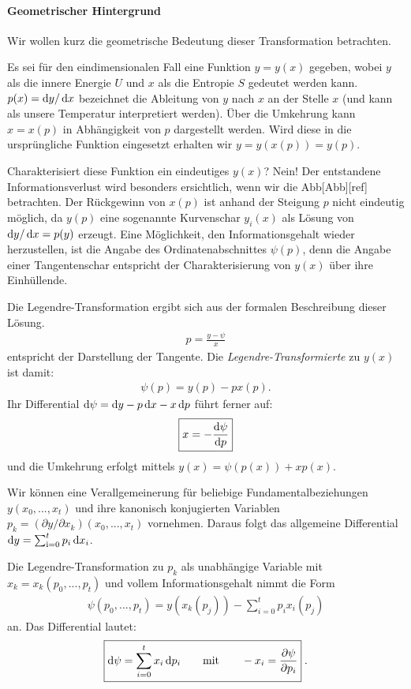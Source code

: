 \paragraph*{Geometrischer Hintergrund}
Wir wollen kurz die geometrische Bedeutung dieser Transformation betrachten. 

Es sei für den  eindimensionalen Fall eine Funktion $y=y(x)$ gegeben, wobei $y$ als die innere Energie $U$ und $x$ als die Entropie $S$ gedeutet werden kann. $p(x)=\mathop{}\!\mathrm{d} y/ \mathop{}\!\mathrm{d} x$ bezeichnet die Ableitung von $y$ nach $x$ an der Stelle $x$ (und kann als unsere Temperatur interpretiert werden). Über die Umkehrung kann $x=x(p)$ in Abhängigkeit von $p$ dargestellt werden. Wird diese in die ursprüngliche Funktion eingesetzt erhalten wir $y=y(x(p))=y(p)$. 

Charakterisiert diese Funktion ein eindeutiges $y(x)$? Nein! Der entstandene Informationsverlust wird besonders ersichtlich, wenn wir die Abb[Abb][ref] betrachten. Der Rückgewinn von $x(p)$ ist anhand der Steigung $p$ nicht eindeutig möglich, da $y(p)$ eine sogenannte Kurvenschar $y_i(x)$ als Lösung von $\mathop{}\!\mathrm{d} y/\mathop{}\!\mathrm{d} x=p(y)$ erzeugt. Eine Möglichkeit, den Informationsgehalt wieder herzustellen, ist die Angabe des Ordinatenabschnittes $\psi(p)$, denn die Angabe einer Tangentenschar entspricht der Charakterisierung von $y(x)$ über ihre Einhüllende. 

Die Legendre-Transformation ergibt sich aus der formalen Beschreibung dieser Lösung.
\begin{align*}
    p=\frac{y-\psi}{x}
\end{align*}
entspricht der Darstellung der Tangente.
Die \emph{Legendre-Transformierte} zu $y(x)$ ist damit:
\begin{align*}
    \boxed{\psi(p)=y(p)-px(p)}.
\end{align*}
Ihr Differential $\mathop{}\!\mathrm{d} \psi=\mathop{}\!\mathrm{d} y-p\mathop{}\!\mathrm{d} x-x\mathop{}\!\mathrm{d} p$ führt ferner auf:
\begin{align*}
    \boxed{x=-\frac{\mathop{}\!\mathrm{d} \psi}{\mathop{}\!\mathrm{d} p}}
\end{align*}
und die Umkehrung erfolgt mittels $y(x)=\psi(p(x))+xp(x)$.

Wir können eine Verallgemeinerung für beliebige Fundamentalbeziehungen $y(x_0,...,x_t)$ und ihre kanonisch konjugierten Variablen $p_k=(\partial y/\partial x_k)(x_0,...,x_t)$ vornehmen.
Daraus folgt das allgemeine Differential $\mathop{}\!\mathrm{d} y=\sum_\mathrm{i=0}^tp_i\mathop{}\!\mathrm{d} x_i$. 
\begin{formal}
    Die Legendre-Transformation zu $p_k$ als unabhängige Variable mit $x_k=x_k(p_0,...,p_t)$ und vollem Informationsgehalt nimmt die Form 
\begin{align*}
    \boxed{\psi(p_0,...,p_t)=y(x_k(p_j))-\sum^t_{i=0}p_ix_i(p_j)}
\end{align*}
an. Das Differential lautet:
\begin{align*}
    \boxed{\mathop{}\!\mathrm{d} \psi=\sum^t_{i=0}x_i\mathop{}\!\mathrm{d} p_i \qquad \mathrm{mit}\qquad -x_i=\frac{\partial \psi}{\partial p_i}}\;.
\end{align*}
\end{formal}


